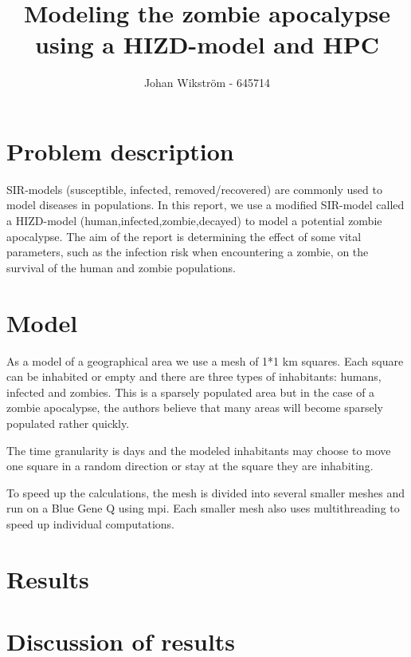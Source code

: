 \documentclass{report}
\title{Modeling the zombie apocalypse using a HIZD-model and HPC}
\author{Johan Wikström - 645714}
\begin{document}
\maketitle
\tableofcontents
\section{Problem description}	
SIR-models (susceptible, infected, removed/recovered) are commonly used to model diseases in populations. In this report, we use a modified SIR-model called a HIZD-model (human,infected,zombie,decayed) to model a potential zombie apocalypse. The aim of the report is determining the effect of some vital parameters, such as the infection risk when encountering a zombie, on the survival of the human and zombie populations.
\section{Model}
As a model of a geographical area we use a mesh of 1*1 km squares. Each square can be inhabited or empty and there are three types of inhabitants: humans, infected and zombies. This is a sparsely populated area but in the case of a zombie apocalypse, the authors believe that many areas will become sparsely populated rather quickly.

The time granularity is days and the modeled inhabitants may choose to move one square in a random direction or stay at the square they are inhabiting.

To speed up the calculations, the mesh is divided into several smaller meshes and run on a Blue Gene Q using mpi. Each smaller mesh also uses multithreading to speed up individual computations.


\section{Results}

\section{Discussion of results}
\end{document}
